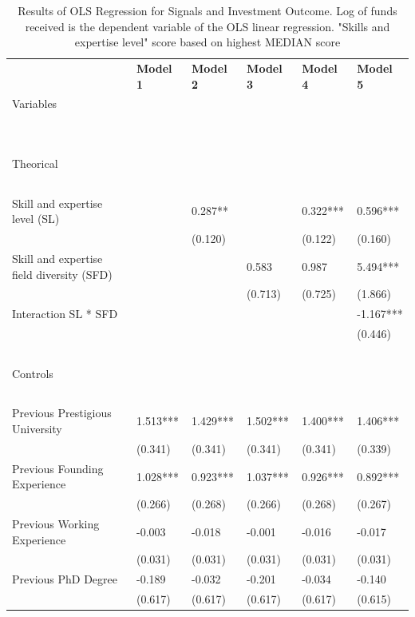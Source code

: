 \documentclass[12pt]{article}
\begin{document}
\begin{table}[!ht]
\scriptsize
    \centering
    \caption{Results of OLS Regression for Signals and Investment Outcome. Log of funds received is the dependent variable of the OLS linear regression. "Skills and expertise level" score based on highest MEDIAN score}
    \begin{tabular}{llllll}
        \toprule
        ~ & \textbf{Model 1} & \textbf{Model 2} & \textbf{Model 3} & \textbf{Model 4} & \textbf{Model 5} \\
        Variables & ~ & ~ & ~ & ~ & ~ \\
        ~ & ~ & ~ & ~ & ~ & ~ \\
        \midrule
        ~ & ~ & ~ & ~ & ~ & ~ \\
        Theorical & ~ & ~ & ~ & ~ & ~ \\
        & ~ & ~ & ~ & ~ & ~ \\
        Skill and expertise level (SL) & ~ & 0.287** & ~ & 0.322*** & 0.596*** \\
        ~ & ~ & (0.120) & ~ & (0.122) & (0.160) \\
        Skill and expertise field diversity (SFD) & ~ & ~ & 0.583 & 0.987 & 5.494*** \\
        ~ & ~ & ~ & (0.713) & (0.725) & (1.866) \\
        Interaction SL * SFD & ~ & ~ & ~ & ~ & -1.167*** \\
        ~ & ~ & ~ & ~ & ~ & (0.446) \\
        ~ & ~ & ~ & ~ & ~ & ~ \\
        Controls & ~ & ~ & ~ & ~ & ~ \\
        & ~ & ~ & ~ & ~ & ~ \\
        Previous Prestigious University & 1.513*** & 1.429*** & 1.502*** & 1.400*** & 1.406*** \\
        ~ & (0.341) & (0.341) & (0.341) & (0.341) & (0.339) \\
        Previous Founding Experience & 1.028*** & 0.923*** & 1.037*** & 0.926*** & 0.892*** \\
        ~ & (0.266) & (0.268) & (0.266) & (0.268) & (0.267) \\
        Previous Working Experience & -0.003 & -0.018 & -0.001 & -0.016 & -0.017 \\
        ~ & (0.031) & (0.031) & (0.031) & (0.031) & (0.031) \\
        Previous PhD Degree & -0.189 & -0.032 & -0.201 & -0.034 & -0.140 \\
        ~ & (0.617) & (0.617) & (0.617) & (0.617) & (0.615) \\

\end{tabular}
\end{table}
\end{document}
